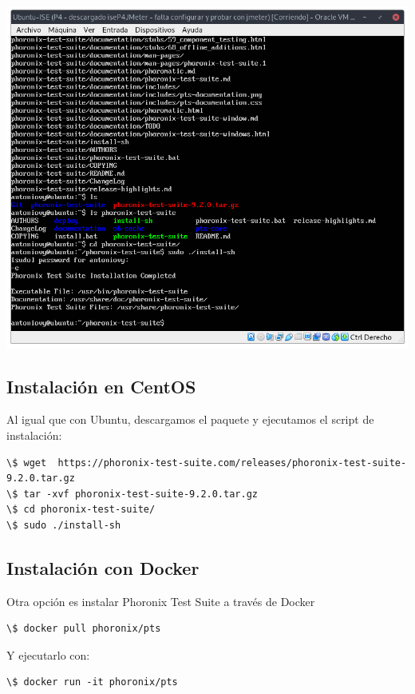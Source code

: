 \documentclass[12pt, spanish]{article}
\begin{document}
\begin{center}
\includegraphics[scale=0.35]{instalacion_pts.png}
\end{center}


\subsection{Instalación en CentOS}

Al igual que con Ubuntu, descargamos el paquete y ejecutamos el script de instalación:

\begin{verbatim}
\$ wget  https://phoronix-test-suite.com/releases/phoronix-test-suite-9.2.0.tar.gz
\$ tar -xvf phoronix-test-suite-9.2.0.tar.gz
\$ cd phoronix-test-suite/
\$ sudo ./install-sh
\end{verbatim}


\subsection{Instalación con Docker}

Otra opción es instalar Phoronix Test Suite a través de Docker\cite{pts_docker}

\begin{verbatim}
\$ docker pull phoronix/pts
\end{verbatim}

Y ejecutarlo con:

\begin{verbatim}
\$ docker run -it phoronix/pts
\end{verbatim}
\end{document}
